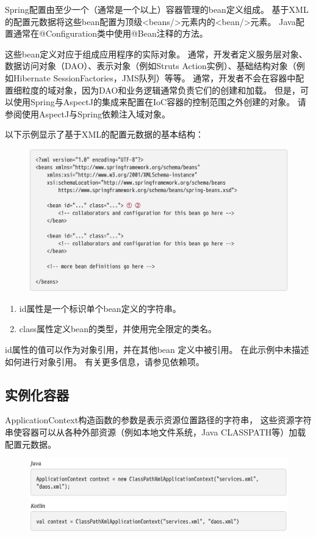 Spring配置由至少一个（通常是一个以上）容器管理的bean定义组成。 
基于XML的配置元数据将这些bean配置为顶级<beans/>元素内的<bean/>元素。
Java配置通常在@Configuration类中使用@Bean注释的方法。

这些bean定义对应于组成应用程序的实际对象。
通常，开发者定义服务层对象、数据访问对象（DAO）、表示对象（例如Struts Action实例）、基础结构对象（例如Hibernate SessionFactories，JMS队列）等等。
通常，开发者不会在容器中配置细粒度的域对象，因为DAO和业务逻辑通常负责它们的创建和加载。
但是，可以使用Spring与AspectJ的集成来配置在IoC容器的控制范围之外创建的对象。
请参阅使用AspectJ与Spring依赖注入域对象。

\newpage
以下示例显示了基于XML的配置元数据的基本结构：

\begin{figure}[ht]
    \centering
    \includegraphics[width=1\linewidth]{./Figure/IMG_code_1.png}
  \end{figure}

\begin{enumerate}
    \item id属性是一个标识单个bean定义的字符串。
    \item class属性定义bean的类型，并使用完全限定的类名。
\end{enumerate}

id属性的值可以作为对象引用，并在其他bean 定义中被引用。 
在此示例中未描述如何进行对象引用。 有关更多信息，请参见依赖项。

\subsection{实例化容器}
ApplicationContext构造函数的参数是表示资源位置路径的字符串，
这些资源字符串使容器可以从各种外部资源（例如本地文件系统，Java CLASSPATH等）加载配置元数据。

\begin{figure}[ht]
\centering
\includegraphics[width=1\linewidth]{./Figure/IMG_code_2.png}
\end{figure}


